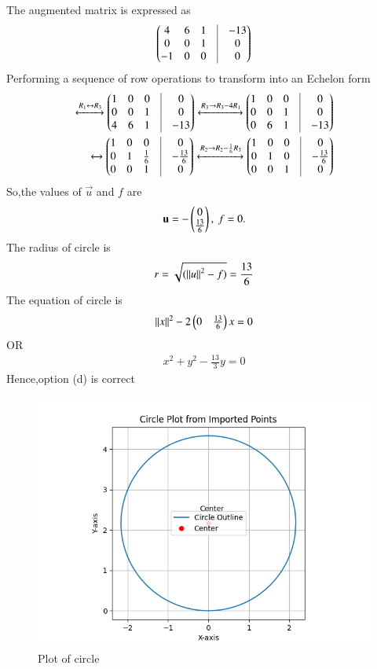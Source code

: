 \documentclass[journal]{IEEEtran}
\numberwithin{equation}{enumi}
\numberwithin{figure}{enumi}
\begin{document}
The augmented matrix is expressed as
\begin{align}
	\myvec{
	        4 & 6 & 1 & \vrule & -13\\
	       0 & 0 & 1 & \vrule & 0\\
-1 & 0 & 0 & \vrule & 0}
\end{align}
Performing a sequence of row operations to transform into an Echelon form
\begin{align*}
	\xleftrightarrow[]{{R_1\leftrightarrow R_3}}
	\myvec{1 & 0 & 0 & \vrule & 0\\
	        0 &  0 & 1 & \vrule & 0\\
	        4 & 6 & 1 & \vrule & -13}
	\xleftrightarrow[]{{R_3\rightarrow R_3-4R_1}}
	\myvec{1 & 0 & 0 & \vrule & 0\\
	        0 &  0 & 1 & \vrule & 0\\
	        0 &  6 & 1 & \vrule & -13}\\
	\xleftrightarrow[]{{}}
	\myvec{ 1 & 0 & 0 & \vrule & 0\\
	        0 &  1 & \frac{1}{6} & \vrule & -\frac{13}{6}\\
	        0 &  0 & 1 & \vrule & 0}	
	\xleftrightarrow[]{{R_2\rightarrow R_2-\frac{1}{6}R_3}}
	\myvec{ 1 &  0 & 0 & \vrule & 0\\
	        0 &  1 & 0 & \vrule & -\frac{13}{6}\\
	        0 &  0 & 1 & \vrule & 0}
\end{align*}
So,the values of $\vec{u}$ and $f$ are
\begin{align}
	\mathbf{u} = -\begin{pmatrix}0\\\frac{13}{6}\end{pmatrix},\
	f = 0.
\end{align}
The radius of circle is
\begin{align}
	r=\sqrt{(\left\lVert u\right\rVert^2-f)}=\frac{13}{6}
\end{align}
The equation of circle is
\begin{align}
	\left\lVert x\right\rVert^2-2\begin{pmatrix}0 & \frac{13}{6}\end{pmatrix}x=0
\end{align}
OR
\begin{align}
x^2+y^2-\frac{13}{3}y=0
\end{align}
Hence,option (d) is correct
\begin{figure}[h!]
   \centering
   \includegraphics[width=0.7\linewidth]{figs/Figure_1.png}
   \caption{Plot of circle}
   \label{stemplot}
\end{figure}
\end{document}
